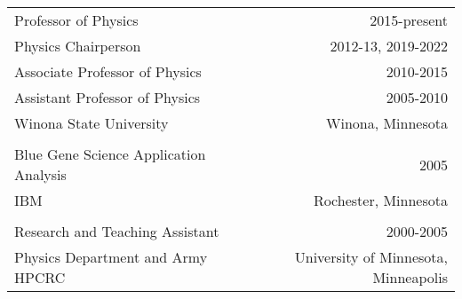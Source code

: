 \documentclass[margin,line,letterpaper]{res}
\begin{document}
\begin{resume}
\begin{table}[h]
\begin{center}
\begin{tabular}{lr}
Professor of Physics&2015-present\\
Physics Chairperson &2012-13, 2019-2022\\
Associate Professor of Physics&2010-2015\\
Assistant Professor of Physics&2005-2010\\
Winona State University&Winona, Minnesota\\
\\
Blue Gene Science Application Analysis &  2005\\
IBM & Rochester, Minnesota\\
\\
Research and Teaching Assistant & 2000-2005\\
Physics Department  and Army HPCRC & University of Minnesota, Minneapolis\\
\end{tabular}
\end{center}
\end{table}


\end{resume}
\end{document}
